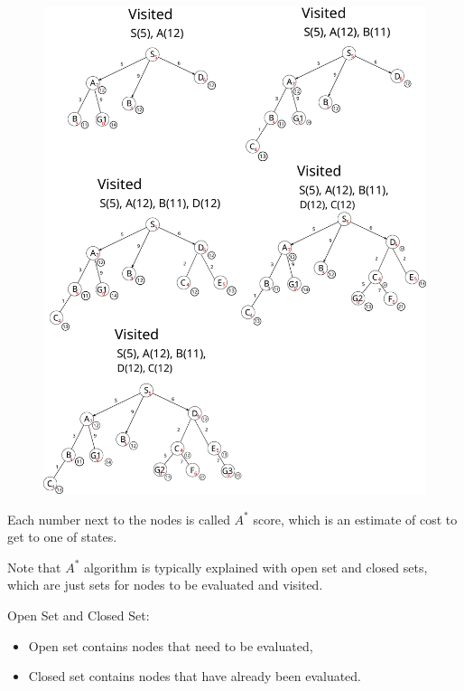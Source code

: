\begin{figure}[h]
	\centering
	\includegraphics[scale=0.60]{./images/search_alg/astar_search.pdf}
	\label{fig:astar_search}
\end{figure}

Each number next to the nodes is called $A^*$ score, which is an estimate of cost to get to one of states. 

Note that $A^*$ algorithm is typically explained with open set and closed sets, which are just sets for nodes to be evaluated and visited. 

Open Set and Closed Set:
\begin{itemize}
	\item Open set contains nodes that need to be evaluated, 
	\item Closed set contains nodes that have already been evaluated.
\end{itemize}
